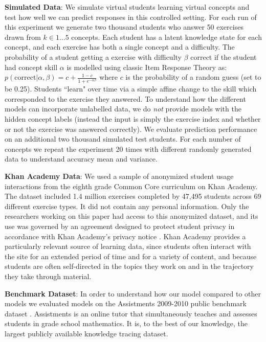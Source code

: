 \documentclass{article} \usepackage{nips,times}
\begin{document}
\textbf{Simulated Data}: We simulate virtual students learning virtual concepts and test how well we can predict responses in this controlled setting.
For each run of this experiment we generate two thousand students who answer 50 exercises drawn from $k \in {1 \dots 5}$ concepts.
Each student has a latent knowledge state for each concept, and each exercise has both a single concept and a difficulty.
The probability of a student getting a exercise with difficulty $\beta$ correct if the student had concept skill $\alpha$ is modelled using classic Item Response Theory \cite{drasgow1990item} as:
$p(\text{correct} | \alpha, \beta) = c + \frac{1 - c}{1 + e^{-\alpha \beta}}$
where $c$ is the probability of a random guess (set to be 0.25). Students ``learn" over time via a simple affine change to the skill which corresponded to the exercise they answered. To understand how the different models can incorporate unlabelled data, we do \emph{not} provide models with the hidden concept labels (instead the input is simply the exercise index and whether or not the exercise was answered correctly). We evaluate prediction performance on an additional two thousand simulated test students. For each number of concepts we repeat the experiment 20 times with different randomly generated data to understand accuracy mean and variance.

\textbf{Khan Academy Data}: We used a sample of anonymized student usage interactions from the eighth grade Common Core curriculum on Khan Academy. The dataset included 1.4 million exercises completed by 47,495 students across 69 different exercise types. It did not contain any personal information. Only the researchers working on this paper had access to this anonymized dataset, and its use was governed by an agreement designed to protect student privacy in accordance with Khan Academy’s privacy notice \cite{KAprivacy}. Khan Academy provides a particularly relevant source of learning data, since students often interact with the site for an extended period of time and for a variety of content, and because students are often self-directed in the topics they work on and in the trajectory they take through material.





\textbf{Benchmark Dataset}: In order to understand how our model compared to other models we evaluated models on the Assistments 2009-2010 public benchmark dataset \cite{feng2009addressing}. Assistments is an online tutor that simultaneously teaches and assesses students in grade school mathematics. It is, to the best of our knowledge, the largest publicly available knowledge tracing dataset.
\end{document}
